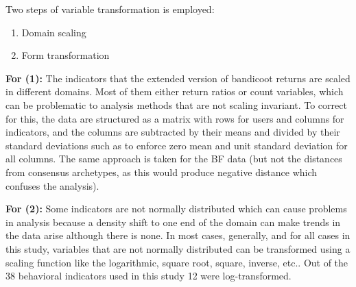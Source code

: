 Two steps of variable transformation is employed:
\begin{enumerate}
	\item Domain scaling
	\item Form transformation
\end{enumerate}

\textbf{For (1):}
The indicators that the extended version of bandicoot returns are scaled in different domains. Most of them either return ratios or count variables, which can be problematic to analysis methods that are not scaling invariant. To correct for this, the data are structured as a matrix with rows for users and columns for indicators, and the columns are subtracted by their means and divided by their standard deviations such as to enforce zero mean and unit standard deviation for all columns. The same approach is taken for the BF data (but not the distances from consensus archetypes, as this would produce negative distance which confuses the analysis).

\textbf{For (2):}
Some indicators are not normally distributed which can cause problems in analysis because a density shift to one end of the domain can make trends in the data arise although there is none. In most cases, generally, and for all cases in this study, variables that are not normally distributed can be transformed using a scaling function like the logarithmic, square root, square, inverse, etc.. Out of the 38 behavioral indicators used in this study 12 were log-transformed.